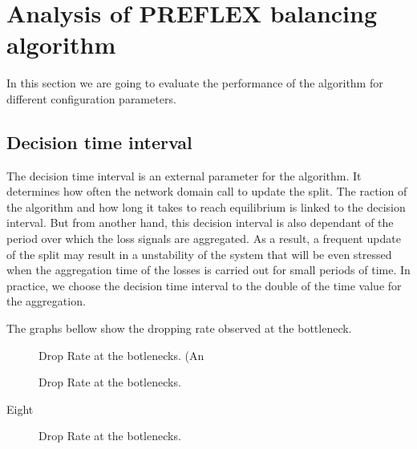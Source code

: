 \section{Analysis of PREFLEX balancing algorithm}

In this section we are going to evaluate the performance of the algorithm for different configuration parameters. 

\subsection{Decision time interval}

The decision time interval is an external parameter for the algorithm. It determines how often the network domain call to update the split. The raction of the algorithm and how long it takes to reach equilibrium is linked to the decision interval. But from another hand, this decision interval is also dependant of the period over which the loss signals are aggregated. As a result, a frequent update of the split may result in a unstability of the system that will be even stressed when the aggregation time of the losses is carried out for small periods of time. In practice, we choose the decision time interval to the double of the time value for the aggregation.

The graphs bellow show the dropping rate observed at the bottleneck. 

\begin{figure}[h]
 \begin{center}

\caption{
  Drop Rate at the botlenecks. (An 
    \label{fig:split-eight}
}
\end{center}
\end{figure}

 \begin{figure}[h!]
 \begin{center}
\caption{
  Drop Rate at the botlenecks.
    \label{fig:split-time-four}
}
\end{center}

\end{figure}

\clearpage

Eight

\begin{figure}[h]
 \begin{center}

\caption{
  Drop Rate at the botlenecks.
    \label{fig:split-one}
}
\end{center}
\end{figure}

